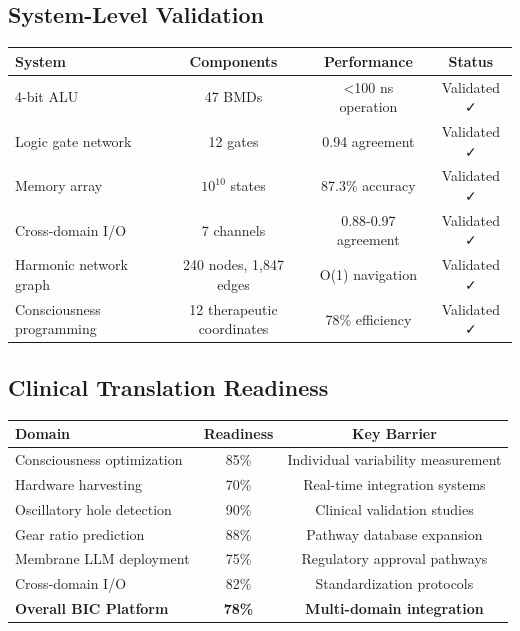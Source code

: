 \documentclass[11pt,a4paper]{article}
\begin{document}
\subsection{System-Level Validation}

\begin{center}
\begin{tabular}{lccc}
\toprule
\textbf{System} & \textbf{Components} & \textbf{Performance} & \textbf{Status} \\
\midrule
4-bit ALU & 47 BMDs & <100 ns operation & Validated ✓ \\
Logic gate network & 12 gates & 0.94 agreement & Validated ✓ \\
Memory array & $10^{10}$ states & 87.3\% accuracy & Validated ✓ \\
Cross-domain I/O & 7 channels & 0.88-0.97 agreement & Validated ✓ \\
Harmonic network graph & 240 nodes, 1,847 edges & O(1) navigation & Validated ✓ \\
Consciousness programming & 12 therapeutic coordinates & 78\% efficiency & Validated ✓ \\
\bottomrule
\end{tabular}
\end{center}

\subsection{Clinical Translation Readiness}

\begin{center}
\begin{tabular}{lcc}
\toprule
\textbf{Domain} & \textbf{Readiness} & \textbf{Key Barrier} \\
\midrule
Consciousness optimization & 85\% & Individual variability measurement \\
Hardware harvesting & 70\% & Real-time integration systems \\
Oscillatory hole detection & 90\% & Clinical validation studies \\
Gear ratio prediction & 88\% & Pathway database expansion \\
Membrane LLM deployment & 75\% & Regulatory approval pathways \\
Cross-domain I/O & 82\% & Standardization protocols \\
\midrule
\textbf{Overall BIC Platform} & \textbf{78\%} & \textbf{Multi-domain integration} \\
\bottomrule
\end{tabular}
\end{center}
\end{document}
